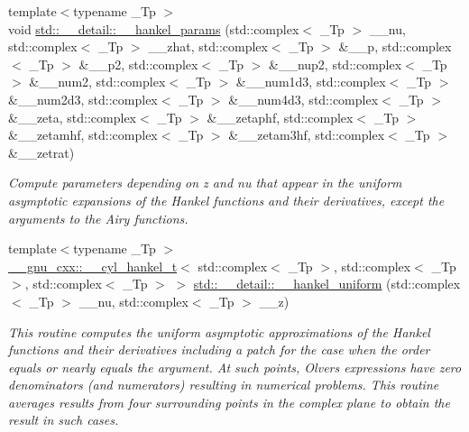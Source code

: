 \begin{DoxyCompactItemize}
\item 
{\footnotesize template$<$typename \+\_\+\+Tp $>$ }\\void \hyperlink{namespacestd_1_1____detail_aff42671a79cd3852a57752f79c82f8da}{std\+::\+\_\+\+\_\+detail\+::\+\_\+\+\_\+hankel\+\_\+params} (std\+::complex$<$ \+\_\+\+Tp $>$ \+\_\+\+\_\+nu, std\+::complex$<$ \+\_\+\+Tp $>$ \+\_\+\+\_\+zhat, std\+::complex$<$ \+\_\+\+Tp $>$ \&\+\_\+\+\_\+p, std\+::complex$<$ \+\_\+\+Tp $>$ \&\+\_\+\+\_\+p2, std\+::complex$<$ \+\_\+\+Tp $>$ \&\+\_\+\+\_\+nup2, std\+::complex$<$ \+\_\+\+Tp $>$ \&\+\_\+\+\_\+num2, std\+::complex$<$ \+\_\+\+Tp $>$ \&\+\_\+\+\_\+num1d3, std\+::complex$<$ \+\_\+\+Tp $>$ \&\+\_\+\+\_\+num2d3, std\+::complex$<$ \+\_\+\+Tp $>$ \&\+\_\+\+\_\+num4d3, std\+::complex$<$ \+\_\+\+Tp $>$ \&\+\_\+\+\_\+zeta, std\+::complex$<$ \+\_\+\+Tp $>$ \&\+\_\+\+\_\+zetaphf, std\+::complex$<$ \+\_\+\+Tp $>$ \&\+\_\+\+\_\+zetamhf, std\+::complex$<$ \+\_\+\+Tp $>$ \&\+\_\+\+\_\+zetam3hf, std\+::complex$<$ \+\_\+\+Tp $>$ \&\+\_\+\+\_\+zetrat)
\begin{DoxyCompactList}\small\item\em Compute parameters depending on z and nu that appear in the uniform asymptotic expansions of the Hankel functions and their derivatives, except the arguments to the Airy functions. \end{DoxyCompactList}\item 
{\footnotesize template$<$typename \+\_\+\+Tp $>$ }\\\hyperlink{struct____gnu__cxx_1_1____cyl__hankel__t}{\+\_\+\+\_\+gnu\+\_\+cxx\+::\+\_\+\+\_\+cyl\+\_\+hankel\+\_\+t}$<$ std\+::complex$<$ \+\_\+\+Tp $>$, std\+::complex$<$ \+\_\+\+Tp $>$, std\+::complex$<$ \+\_\+\+Tp $>$ $>$ \hyperlink{namespacestd_1_1____detail_a4de129af45576a92a42fa2b7fc2d17f3}{std\+::\+\_\+\+\_\+detail\+::\+\_\+\+\_\+hankel\+\_\+uniform} (std\+::complex$<$ \+\_\+\+Tp $>$ \+\_\+\+\_\+nu, std\+::complex$<$ \+\_\+\+Tp $>$ \+\_\+\+\_\+z)
\begin{DoxyCompactList}\small\item\em This routine computes the uniform asymptotic approximations of the Hankel functions and their derivatives including a patch for the case when the order equals or nearly equals the argument. At such points, Olver\textquotesingle{}s expressions have zero denominators (and numerators) resulting in numerical problems. This routine averages results from four surrounding points in the complex plane to obtain the result in such cases. \end{DoxyCompactList}\item 

\end{DoxyCompactItemize}
